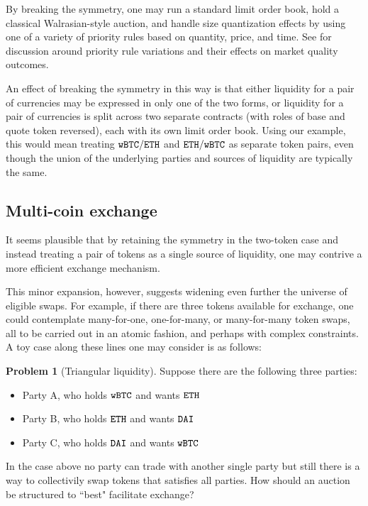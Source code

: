 \documentclass[11pt, reqno]{amsart}
\theoremstyle{definition}
\newtheorem{problem}{Problem}[subsection]
\theoremstyle{remark}
\newcommand{\BTC}{\textnormal{\texttt{wBTC}}}
\newcommand{\ETH}{\textnormal{\texttt{ETH}}}
\newcommand{\DAI}{\textnormal{\texttt{DAI}}}
\begin{document}
By breaking the symmetry, one may run a standard limit order book, hold a
classical Walrasian-style auction, and handle size quantization effects by
using one of a variety of priority rules based on quantity, price, and time.
See \cite{BeLaLiVa22} for discussion around priority rule variations and their
effects on market quality outcomes.

An effect of breaking the symmetry in this way is that either liquidity for a
pair of currencies may be expressed in only one of the two forms, or liquidity
for a pair of currencies is split across two separate contracts (with roles of
base and quote token reversed), each with its own limit order book.
Using our example, this would mean treating $\BTC/\ETH$ and $\ETH/\BTC$ as
separate token pairs, even though the union of the underlying parties and
sources of liquidity are typically the same.

\subsection{Multi-coin exchange}
It seems plausible that by retaining the symmetry in the two-token case and
instead treating a pair of tokens as a single source of liquidity, one may
contrive a more efficient exchange mechanism.

This minor expansion, however, suggests widening even further the universe of
eligible swaps. For example, if there are three tokens available for exchange,
one could contemplate many-for-one, one-for-many, or many-for-many token swaps,
all to be carried out in an atomic fashion, and perhaps with complex
constraints. A toy case along these lines one may consider is as follows:

\begin{problem}[Triangular liquidity]
Suppose there are the following three parties:
\begin{itemize}
	\item Party A, who holds $\BTC$ and wants $\ETH$
	\item Party B, who holds $\ETH$ and wants $\DAI$
	\item Party C, who holds $\DAI$ and wants $\BTC$
\end{itemize}

In the case above no party can trade with another single party but still there
is a way to collectivily swap tokens that satisfies all parties.
How should an auction be structured to ``best" facilitate exchange?
\end{problem}
\end{document}
